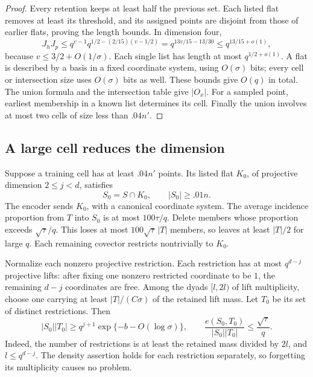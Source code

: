\begin{proof}
Every retention keeps at least half the previous set.
Each listed flat removes at least its threshold, and its assigned
points are disjoint from those of earlier flats, proving the
length bounds. In dimension four,
\[
 J_hJ_p
 \le q^{v-1}q^{1/2-(2/15)(v-1/2)}
 =q^{13v/15-13/30}
 \le q^{13/15+o(1)},
\]
because \(v\le3/2+O(1/\sigma)\).
Each single list has length at most \(q^{1/2+o(1)}\).
A flat is described by a basis in a fixed coordinate system, using
\(O(\sigma)\) bits; every cell or intersection size uses
\(O(\sigma)\) bits as well. These bounds give \(O(q)\) in total.
The union formula and the intersection table give \(|O_x|\).
For a sampled point, earliest membership in a known list determines
its cell. Finally the union involves at most two cells of size
less than \(.04n'\).
\end{proof}

\subsection{A large cell reduces the dimension}

Suppose a training cell has at least \(.04n'\) points.
Its listed flat \(K_0\), of projective dimension \(2\le j<d\),
satisfies
\[
 S_0=S\cap K_0,\qquad |S_0|\ge .01n.
\]
The encoder sends \(K_0\), with a canonical coordinate system.
The average incidence proportion from \(T\) into \(S_0\) is at
most \(100\tau/q\). Delete members whose proportion exceeds
\(\sqrt\tau/q\). This loses at most \(100\sqrt\tau\,|T|\) members,
so leaves at least \(|T|/2\) for large \(q\).
Each remaining covector restricts nontrivially to \(K_0\).

Normalize each nonzero projective restriction. Each restriction
has at most \(q^{d-j}\) projective lifts: after fixing one
nonzero restricted coordinate to be \(1\), the remaining \(d-j\)
coordinates are free. Among the dyads \([l,2l)\) of lift
multiplicity, choose one carrying at least \(|T|/(C\sigma)\)
of the retained lift mass. Let \(T_0\) be its set of distinct
restrictions. Then
\begin{equation}
\label{eq:reduced-pair}
 |S_0||T_0|\ge q^{j+1}\exp\{-b-O(\log\sigma)\},
 \qquad
 \frac{e(S_0,T_0)}{|S_0||T_0|}\le\frac{\sqrt\tau}{q}.
\end{equation}
Indeed, the number of restrictions is at least the retained mass
divided by \(2l\), and \(l\le q^{d-j}\).
The density assertion holds for each restriction separately,
so forgetting its multiplicity causes no problem.

